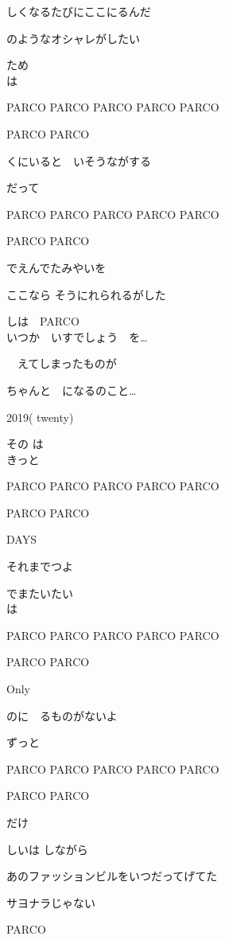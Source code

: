 しくなるたびにここにるんだ

のようなオシャレがしたい

ため
\\

は

PARCO PARCO PARCO PARCO PARCO

PARCO PARCO


くにいると　いそうながする

だって

PARCO PARCO PARCO PARCO PARCO

PARCO PARCO


でえんでたみやいを

ここなら そうにれられるがした

しは　PARCO
\\

いつか　いすでしょう　を…

　えてしまったものが

ちゃんと　になるのこと…

2019( {twenty})

その は
\\

きっと

PARCO PARCO PARCO PARCO PARCO

PARCO PARCO

DAYS

それまでつよ

でまたいたい
\\

は

PARCO PARCO PARCO PARCO PARCO

PARCO PARCO

Only

のに　るものがないよ

ずっと

PARCO PARCO PARCO PARCO PARCO

PARCO PARCO

だけ

しいは しながら

あのファッションビルをいつだってげてた

サヨナラじゃない

PARCO
\\
